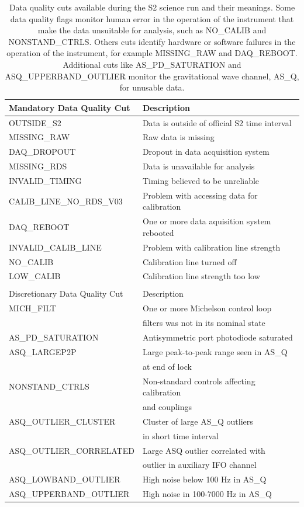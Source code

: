 \begin{table}[p]
\begin{center}
\begin{tabular}{ll}
Mandatory Data Quality Cut & Description \\\hline
OUTSIDE\_S2   &Data is outside of official S2 time interval \\
MISSING\_RAW  &Raw data is missing \\
DAQ\_DROPOUT       & Dropout in data acquisition system \\
MISSING\_RDS       & Data is unavailable for analysis \\
INVALID\_TIMING    & Timing believed to be unreliable \\
CALIB\_LINE\_NO\_RDS\_V03 & Problem with accessing data for calibration \\
DAQ\_REBOOT               & One or more data aquisition system rebooted \\
INVALID\_CALIB\_LINE  & Problem with calibration line strength \\
NO\_CALIB                 & Calibration line turned off \\
LOW\_CALIB                & Calibration line strength too low \\
\hline\hline
\\
Discretionary Data Quality Cut & Description \\\hline
MICH\_FILT    &One or more Michelson control loop \\
&filters was not in its nominal state \\
AS\_PD\_SATURATION & Antisymmetric port photodiode saturated \\
ASQ\_LARGEP2P      & Large peak-to-peak range seen in AS\_Q \\
&at end of lock \\
NONSTAND\_CTRLS    & Non-standard controls affecting calibration\\
&and couplings \\
ASQ\_OUTLIER\_CLUSTER     & Cluster of large AS\_Q outliers \\
&in short time interval \\
ASQ\_OUTLIER\_CORRELATED  & Large ASQ outlier correlated with \\
&outlier in auxiliary IFO channel \\
ASQ\_LOWBAND\_OUTLIER     & High noise below 100 Hz in AS\_Q \\
ASQ\_UPPERBAND\_OUTLIER   & High noise in 100-7000 Hz in AS\_Q \\
\hline\hline
\end{tabular}
\end{center}
\caption{\label{t:dqflags}%
Data quality cuts available during the S2 science run and their meanings. 
Some data quality flags monitor human error in the operation of the
instrument that make the data unsuitable for analysis, such as NO\_CALIB and
NONSTAND\_CTRLS. Others cuts identify hardware or software failures in the
operation of the instrument, for example MISSING\_RAW and DAQ\_REBOOT.
Additional cuts like AS\_PD\_SATURATION and ASQ\_UPPERBAND\_OUTLIER monitor
the gravitational wave channel, AS\_Q, for unusable data.
}
\end{table}

